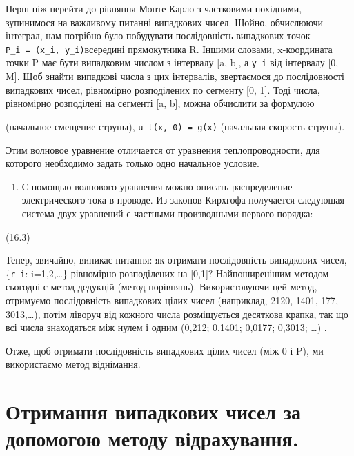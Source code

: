 \documentclass[
  ukrainian,
]{article}
\providecommand{\tightlist}{%
  \setlength{\itemsep}{0pt}\setlength{\parskip}{0pt}}
\begin{document}
Перш ніж перейти до рівняння Монте-Карло з частковими похідними,
зупинимося на важливому питанні випадкових чисел. Щойно, обчислюючи
інтеграл, нам потрібно було побудувати послідовність випадкових точок
\texttt{P\_i\ =\ (x\_i,\ y\_i)}всередині прямокутника R. Іншими словами,
x-координата точки P має бути випадковим числом з інтервалу {[}a, b{]},
а \texttt{y\_i} від інтервалу {[}0, M{]}. Щоб знайти випадкові числа з
цих інтервалів, звертаємося до послідовності випадкових чисел,
рівномірно розподілених по сегменту {[}0, 1{]}. Тоді числа, рівномірно
розподілені на сегменті {[}a, b{]}, можна обчислити за формулою

(начальное смещение струны), \texttt{u\_t(x,\ 0)\ =\ g(x)} (начальная
скорость струны).

Этим волновое уравнение отличается от уравнения теплопроводности, для
которого необходимо задать только одно начальное условие.

\begin{enumerate}
\def\labelenumi{\arabic{enumi}.}
\setcounter{enumi}{3}
\tightlist
\item
  С помощью волнового уравнения можно описать распределение
  электрического тока в проводе. Из законов Кирхгофа получается
  следующая система двух уравнений с частными производными первого
  порядка:
\end{enumerate}

(16.3)

Тепер, звичайно, виникає питання: як отримати послідовність випадкових
чисел, \{\texttt{r\_i}: i=1,2,\ldots\} рівномірно розподілених на
{[}0,1{]}? Найпоширенішим методом сьогодні є метод дедукцій (метод
порівнянь). Використовуючи цей метод, отримуємо послідовність випадкових
цілих чисел (наприклад, 2120, 1401, 177, 3013,\ldots), потім ліворуч від
кожного числа розміщується десяткова крапка, так що всі числа
знаходяться між нулем і одним (0,212; 0,1401; 0,0177; 0,3013; \ldots) .

Отже, щоб отримати послідовність випадкових цілих чисел (між 0 і P), ми
використаємо метод віднімання.

\section{Отримання випадкових чисел за допомогою методу
відрахування.}\label{ux43eux442ux440ux438ux43cux430ux43dux43dux44f-ux432ux438ux43fux430ux434ux43aux43eux432ux438ux445-ux447ux438ux441ux435ux43b-ux437ux430-ux434ux43eux43fux43eux43cux43eux433ux43eux44e-ux43cux435ux442ux43eux434ux443-ux432ux456ux434ux440ux430ux445ux443ux432ux430ux43dux43dux44f.}
\end{document}
